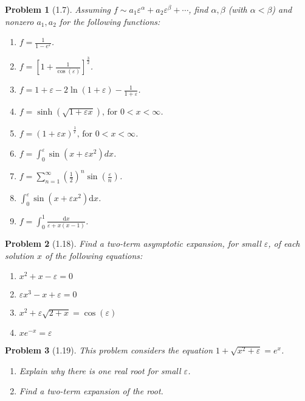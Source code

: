 \documentclass[11pt]{article}
\theoremstyle{problemstyle}
\newtheorem{problem}{Problem}
\begin{document}
\begin{problem}[1.7]
Assuming $f \sim a_1 \varepsilon^\alpha + a_2 \varepsilon^\beta + \cdots$, find $\alpha, \beta$
(with $\alpha < \beta$) and nonzero $a_1, a_2$ for the following functions:
\begin{enumerate}
  \item $\displaystyle f = \frac{1}{1 - e^{\varepsilon}}$.
  \item $\displaystyle f = \left[1 + \frac{1}{\cos(\varepsilon)}\right]^{\frac{3}{2}}$.
  \item $\displaystyle f = 1 + \varepsilon - 2\ln\left(1 + \varepsilon\right) - \frac{1}{1 + \varepsilon}$.
  \item $\displaystyle f = \sinh\left(\sqrt{1 + \varepsilon x}\right) \text{, for } 0 < x < \infty$.
  \item $\displaystyle f = \left(1 + \varepsilon x\right)^{\frac{1}{\varepsilon}} \text{, for } 0 < x < \infty$.
  \item $\displaystyle f = \int_{0}^{\varepsilon} \sin\left(x + \varepsilon x^{2}\right)dx$.
  \item $\displaystyle f = \displaystyle \sum_{n=1}^{\infty} \left(\frac{1}{2}\right)^n 
              \sin\left(\frac{\varepsilon}{n}\right)$.
  \item $\displaystyle \int_0^\varepsilon \sin(x + \varepsilon x^2) \mathrm{d}x$.
  \item $\displaystyle f = \int_0^1 \frac{\mathrm{d}x}{\varepsilon + x(x-1)}$.
\end{enumerate}
\end{problem}

\begin{problem}[1.18]
  Find a two-term asymptotic expansion, for small $\varepsilon$, of each solution $x$ of the
  following equations:
  \begin{enumerate}
    \item $x^2 + x - \varepsilon = 0$
    \item[(e)] $\varepsilon x^3 -x + \varepsilon = 0$
    \item[(h)] $x^2 + \varepsilon \sqrt{2+x} = \cos(\varepsilon)$
    \item[(p)] $xe^{-x} = \varepsilon$
  \end{enumerate}
\end{problem}

\begin{problem}[1.19]
  This problem considers the equation $1 + \sqrt{x^2 + \varepsilon} = e^x$.
  \begin{enumerate}
    \item Explain why there is one real root for small $\varepsilon$.
    \item Find a two-term expansion of the root.
  \end{enumerate}
\end{problem}
\end{document}

